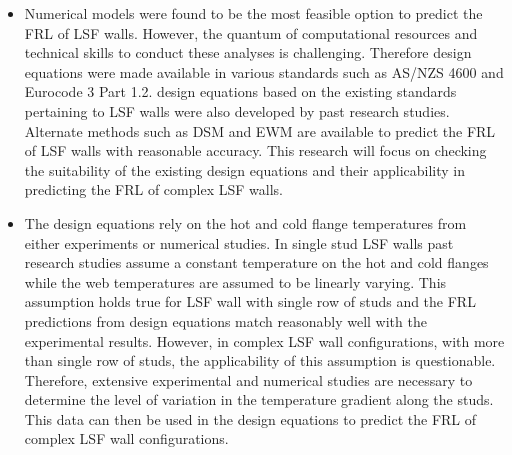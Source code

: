 \begin{itemize}
	\item Numerical models were found to be the most feasible option to predict the FRL of LSF walls. However, the quantum of computational resources and technical skills to conduct these analyses is challenging. Therefore design equations were made available in various standards such as AS/NZS 4600 and Eurocode 3 Part 1.2. design equations based on the existing standards pertaining to LSF walls were also developed by past research studies. Alternate methods such as DSM and EWM are available to predict the FRL of LSF walls with reasonable accuracy. This research will focus on checking the suitability of the existing design equations and their applicability in predicting the FRL of complex LSF walls.
	\item The design equations rely on the hot and cold flange temperatures from either experiments or numerical studies. In single stud LSF walls past research studies assume a constant temperature on the hot and cold flanges while the web temperatures are assumed to be linearly varying. This assumption holds true for LSF wall with single row of studs and the FRL predictions from design equations match reasonably well with the experimental results. However, in complex LSF wall configurations, with more than single row of studs, the applicability of this assumption is questionable. Therefore, extensive experimental and numerical studies are necessary to determine the level of variation in the temperature gradient along the studs. This data can then be used in the design equations to predict the FRL of complex LSF wall configurations.  
\end{itemize}